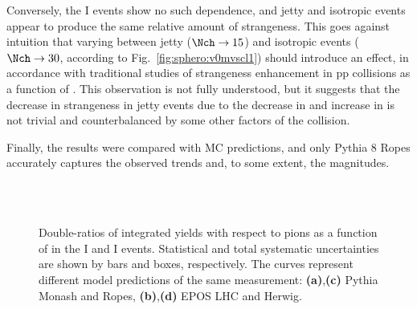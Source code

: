 Conversely, the \VOM I events show no such dependence, and jetty and isotropic events appear to produce the same relative amount of strangeness. This goes against intuition that varying \Nch between jetty ($\Nch \to 15$) and isotropic events ($\Nch \to 30$, according to Fig.~\ref{fig:sphero:v0mvscl1}) should introduce an effect, in accordance with traditional studies of strangeness enhancement in pp collisions as a function of \Nch. This observation is not fully understood, but it suggests that the decrease in strangeness in jetty events due to the decrease in \Nch and  increase in \meanpt is not trivial and counterbalanced by some other factors of the collision.

Finally, the results were compared with MC predictions, and only Pythia 8 Ropes accurately captures the observed trends and, to some extent, the magnitudes.

\begin{figure}[H]
\centering%
\\
\\
\caption{Double-ratios of integrated yields with respect to pions as a function of \SOPT in the \NSPD I and \VOM I events. Statistical and total systematic uncertainties are shown by bars and boxes, respectively. The curves represent different model predictions of the same measurement: \textbf{(a)},\textbf{(c)} Pythia Monash and Ropes, \textbf{(b)},\textbf{(d)} EPOS LHC and Herwig.}
\label{fig:sphero:lvssOpt}
\end{figure}
